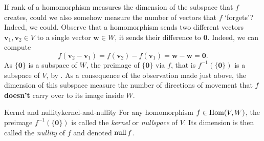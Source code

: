 If rank of a homomorphism measures the dimension of the subspace that $f$
creates, could we also somehow measure the number of vectors that $f$ `forgets'?
Indeed, we could. Observe that a homomorphism sends two different vectors
$\mathbf{v}_1,\mathbf{v}_2 \in V$ to a single vector $\mathbf{w} \in W$, it
sends their difference to $\mathbf{0}$. Indeed, we can compute
\[
 f(\mathbf{v}_2 - \mathbf{v}_1) = f(\mathbf{v}_2) - f(\mathbf{v}_1) = \mathbf{w}
 - \mathbf{w} = \mathbf{0}.
\]
As $\{\mathbf{0}\}$ is a subspace of $W$, the preimage of $\{\mathbf{0}\}$ via
$f$, that is $f^{-1}(\{\mathbf{0}\})$ is a subspace of $V$, by
. As a consequence of the observation made just
above, the dimension of this subspace measure the number of directions of
movement that $f$ \textbf{doesn't} carry over to its image inside $W$.

\begin{definition}{Kernel and nullity}{kernel-and-nullity}
 For any homomorphism $f \in \operatorname{Hom}(V,W)$, the preimage $f^{-1}(\{\mathbf{0}\})$
 is called the \emph{kernel} or \emph{nullspace} of $V$. Its dimension is then
 called the \emph{nullity} of $f$ and denoted $\operatorname{null} f$.
\end{definition}

